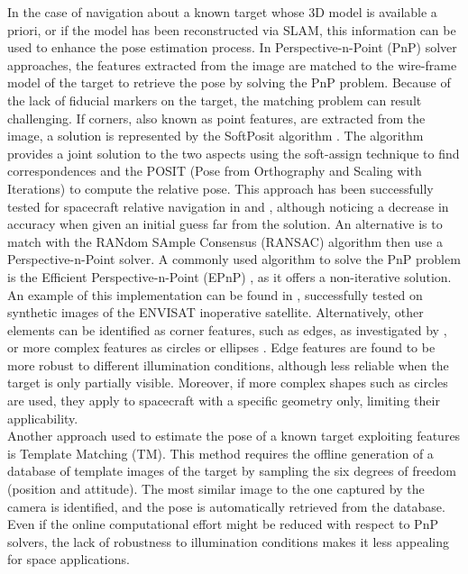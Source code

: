 In the case of navigation about a known target whose 3D model is available a priori, or if the model has been reconstructed via SLAM, this information can be used to enhance the pose estimation process. In Perspective-n-Point (PnP) solver approaches, the features extracted from the image are matched to the wire-frame model of the target to retrieve the pose by solving the PnP problem. Because of the lack of fiducial markers on the target, the matching problem can result challenging. 
If corners, also known as point features, are extracted from the image, a solution is represented by the SoftPosit algorithm \cite{david2004softposit}. The algorithm provides a joint solution to the two aspects using the soft-assign technique to find correspondences and the POSIT (Pose from Orthography and Scaling with Iterations) to compute the relative pose. This approach has been successfully tested for spacecraft relative navigation in \cite{shi2015uncooperative} and \cite{shi2016spacecraft}, although noticing a decrease in accuracy when given an initial guess far from the solution.
An alternative is to match with the RANdom SAmple Consensus (RANSAC) algorithm \cite{fischler1981random} then use a Perspective-n-Point solver. A commonly used algorithm to solve the PnP problem is the Efficient Perspective-n-Point (EPnP) \cite{lepetit2009ep}, as it offers a non-iterative solution. An example of this implementation can be found in \cite{rondao2018multi}, successfully tested on synthetic images of the ENVISAT inoperative satellite.
Alternatively, other elements can be identified as corner features, such as edges, as investigated by \cite{sharma2017reduced}, or more complex features as circles or ellipses \cite{liu2014relative}. Edge features are found to be more robust to different illumination conditions, although less reliable when the target is only partially visible. Moreover, if more complex shapes such as circles are used, they apply to spacecraft with a specific geometry only, limiting their applicability. \\
Another approach used to estimate the pose of a known target exploiting features is Template Matching (TM). This method requires the offline generation of a database of template images of the target by sampling the six degrees of freedom (position and attitude). The most similar image to the one captured by the camera is identified, and the pose is automatically retrieved from the database. Even if the online computational effort might be reduced with respect to PnP solvers, the lack of robustness to illumination conditions makes it less appealing for space applications.\\

